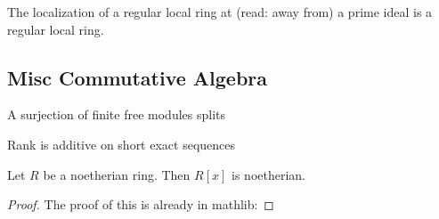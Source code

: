 %



\begin{lemma} \label{thm:regular_rings_localize}
	The localization of a regular local ring at (read: away from) a prime 
	ideal is a regular local ring.
\end{lemma}



\subsection{Misc Commutative Algebra}

\begin{lemma}
  \label{lem:finite_free_surj_splits}
  A surjection of finite free modules splits
\end{lemma}

\begin{lemma}
  \label{lem:rank_additive_exact_seq}
  Rank is additive on short exact sequences
\end{lemma}

\begin{theorem}
  \label{thm:hilbert_basis}
  Let $R$ be a noetherian ring.
  Then $R[x]$ is noetherian.
\end{theorem}

\begin{proof}
  The proof of this is already in mathlib:
\end{proof}

